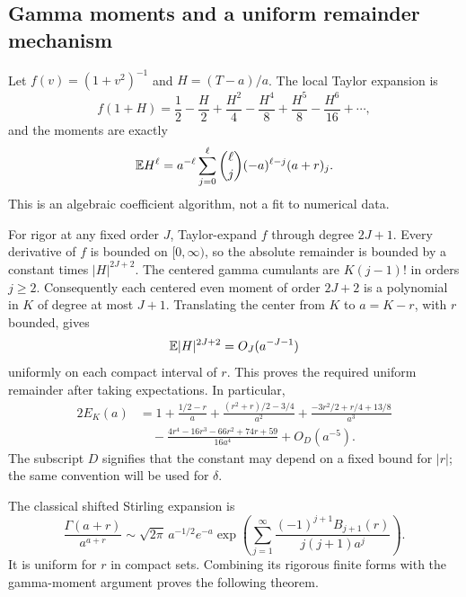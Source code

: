\subsection{Gamma moments and a uniform remainder mechanism}

Let $f(v)=(1+v^2)^{-1}$ and $H=(T-a)/a$. The local Taylor expansion is
\[
 f(1+H)=\frac12-\frac H2+\frac{H^2}4-\frac{H^4}8
                +\frac{H^5}8-\frac{H^6}{16}+\cdots,
\]
and the moments are exactly
\begin{equation}\label{hstruct:eq:gamma-moments}
 \mathbb E H^\ell
 =a^{-\ell}\sum_{j=0}^{\ell}
       \binom{\ell}{j}(-a)^{\ell-j}(a+r)_j.
\end{equation}
This is an algebraic coefficient algorithm, not a fit to numerical data.

For rigor at any fixed order $J$, Taylor-expand $f$ through degree
$2J+1$. Every derivative of $f$ is bounded on $[0,\infty)$, so the
absolute remainder is bounded by a constant times $|H|^{2J+2}$.
The centered gamma cumulants are $K(j-1)!$ in orders $j\ge2$.
Consequently each centered even moment of order $2J+2$ is a polynomial
in $K$ of degree at most $J+1$. Translating the center from $K$ to
$a=K-r$, with $r$ bounded, gives
\[
 \mathbb E|H|^{2J+2}=O_J(a^{-J-1})
\]
uniformly on each compact interval of $r$. This proves the required
uniform remainder after taking expectations. In particular,
\begin{align}
 2E_K(a)
 &=1+\frac{1/2-r}{a}
   +\frac{(r^2+r)/2-3/4}{a^2}
   +\frac{-3r^2/2+r/4+13/8}{a^3}\nonumber\\
 &\quad-\frac{4r^4-16r^3-66r^2+74r+59}{16a^4}
   +O_D(a^{-5}).\label{hstruct:eq:gamma-expansion}
\end{align}
The subscript $D$ signifies that the constant may depend on a fixed
bound for $|r|$; the same convention will be used for $\delta$.

The classical shifted Stirling expansion \cite[\S5.11.8]{hstruct:DLMF} is
\begin{equation}\label{hstruct:eq:shifted-Stirling}
 \frac{\Gamma(a+r)}{a^{a+r}}
 \sim \sqrt{2\pi}\,a^{-1/2}e^{-a}
 \exp\left(\sum_{j=1}^\infty
 \frac{(-1)^{j+1}B_{j+1}(r)}{j(j+1)a^j}\right).
\end{equation}
It is uniform for $r$ in compact sets. Combining its rigorous finite
forms with the gamma-moment argument proves the following theorem.

